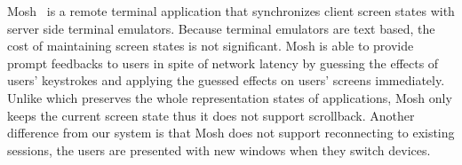 Mosh~\cite{winstein2012mosh} is a remote terminal application  that
synchronizes client screen states with server side terminal emulators.
Because terminal emulators are text based, the cost of maintaining screen
states is not significant. Mosh is able to provide prompt feedbacks to users
in spite of network latency by guessing the effects of users' keystrokes and
applying the guessed effects on users' screens immediately. Unlike \cb which
preserves the whole representation states of applications, Mosh only keeps the
current screen state thus it does not support scrollback. Another difference
from our system is that Mosh does not support reconnecting to existing
sessions, the users are presented with new windows when they switch devices.

